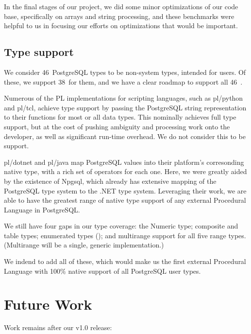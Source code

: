 \documentclass[sigconf,techreport,authorversion,nonacm]{acmart}
\newcommand{\dotnet}{.NET }
\newcommand{\psqltypecount}{46}
\newcommand{\pldotnettypecount}{38}
\begin{document}
In the final stages of our project, we did some minor optimizations
of our code base, specifically on arrays and string processing, and
these benchmarks were helpful to us in focusing our efforts on
optimizations that would be important.

\subsection{Type support}

We consider \psqltypecount\ PostgreSQL types to be non-system types, intended
for users.  Of these, we support \pldotnettypecount\ for them, and we have a
clear roadmap to support all \psqltypecount\ .

Numerous of the PL implementations for scripting languages, such
as pl/python and pl/tcl, achieve type support by passing the
PostgreSQL string representation to their functions for most or all
data types. This nominally achieves full type support, but at the
cost of pushing ambiguity and processing work onto the developer,
as well as significant run-time overhead. We do not consider this
to be  support.

pl/dotnet and pl/java map PostgreSQL values into their platform's
corresonding native type, with a rich set of operators for each one. Here,
we were greatly aided by the existence of Npgsql, which already has
extensive mapping of the PostgreSQL type system to the \dotnet type
system. Leveraging their work, we are able to have the greatest range
of native type support of any external Procedural Language in PostgreSQL.

We still have four gaps in our type coverage: the Numeric type;
composite and table types; enumerated types
(); and multirange support for all five range types.
(Multirange will be a single, generic implementation.)

We indend to add all of these, which would make us the first external
Procedural Language with 100\% native support of all PostgreSQL
user types.

\newpage

\section{Future Work}

Work remains after our v1.0 release:
\end{document}
